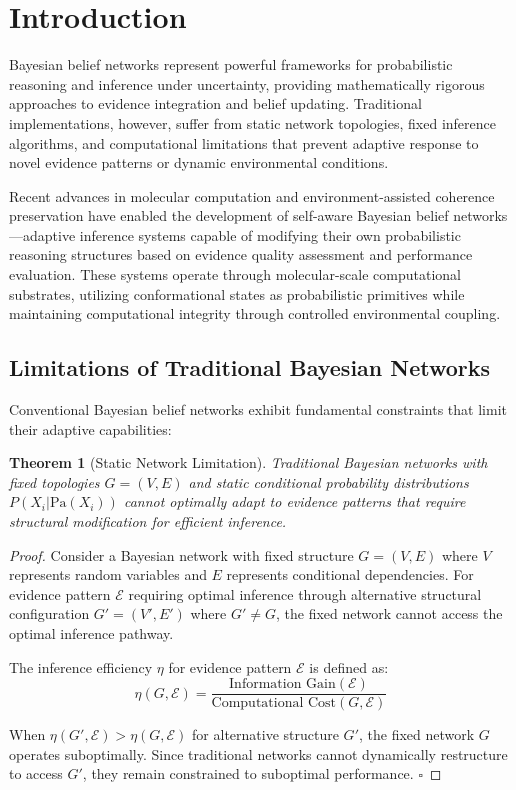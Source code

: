\documentclass[12pt,a4paper]{article}
\newtheorem{theorem}{Theorem}[section]
\begin{document}
\section{Introduction}

Bayesian belief networks represent powerful frameworks for probabilistic reasoning and inference under uncertainty, providing mathematically rigorous approaches to evidence integration and belief updating. Traditional implementations, however, suffer from static network topologies, fixed inference algorithms, and computational limitations that prevent adaptive response to novel evidence patterns or dynamic environmental conditions.

Recent advances in molecular computation and environment-assisted coherence preservation have enabled the development of self-aware Bayesian belief networks—adaptive inference systems capable of modifying their own probabilistic reasoning structures based on evidence quality assessment and performance evaluation. These systems operate through molecular-scale computational substrates, utilizing conformational states as probabilistic primitives while maintaining computational integrity through controlled environmental coupling.

\subsection{Limitations of Traditional Bayesian Networks}

Conventional Bayesian belief networks exhibit fundamental constraints that limit their adaptive capabilities:

\begin{theorem}[Static Network Limitation]
Traditional Bayesian networks with fixed topologies $G = (V, E)$ and static conditional probability distributions $P(X_i | \text{Pa}(X_i))$ cannot optimally adapt to evidence patterns that require structural modification for efficient inference.
\end{theorem}

\begin{proof}
Consider a Bayesian network with fixed structure $G = (V, E)$ where $V$ represents random variables and $E$ represents conditional dependencies. For evidence pattern $\mathcal{E}$ requiring optimal inference through alternative structural configuration $G' = (V', E')$ where $G' \neq G$, the fixed network cannot access the optimal inference pathway.

The inference efficiency $\eta$ for evidence pattern $\mathcal{E}$ is defined as:
\begin{equation}
\eta(G, \mathcal{E}) = \frac{\text{Information Gain}(\mathcal{E})}{\text{Computational Cost}(G, \mathcal{E})}
\end{equation}

When $\eta(G', \mathcal{E}) > \eta(G, \mathcal{E})$ for alternative structure $G'$, the fixed network $G$ operates suboptimally. Since traditional networks cannot dynamically restructure to access $G'$, they remain constrained to suboptimal performance. $\square$
\end{proof}
\end{document}
